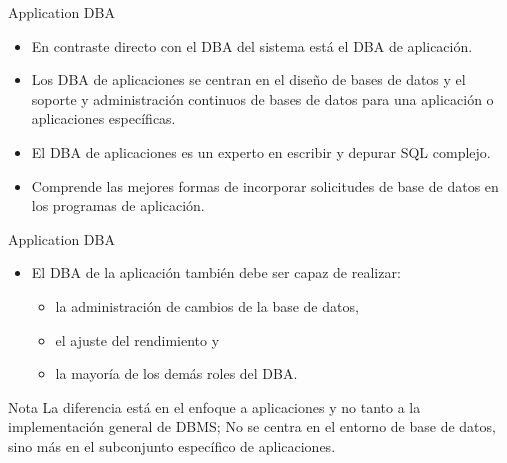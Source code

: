 \documentclass{beamer}
\begin{document}
\begin{frame}{Application DBA}
    \begin{itemize}
        \item En contraste directo con el DBA del sistema está el DBA de aplicación. 
        \item Los DBA de aplicaciones se centran en el diseño de bases de datos y el soporte y administración continuos de bases de datos para una aplicación o aplicaciones específicas.
        \item El DBA de aplicaciones es un experto en escribir y depurar SQL complejo.
        \item Comprende las mejores formas de incorporar solicitudes de base de datos en los programas de aplicación. 
    \end{itemize}
\end{frame}

\begin{frame}{Application DBA}
    \begin{itemize}
        \item El DBA de la aplicación también debe ser capaz de realizar:
        \begin{itemize}
            \item la administración de cambios de la base de datos, 
            \item el ajuste del rendimiento y 
            \item la mayoría de los demás roles del DBA. 
        \end{itemize}
    \end{itemize}
    \begin{alertblock}{Nota}
        La diferencia está en el enfoque a aplicaciones y no tanto a la implementación general de DBMS; No se centra en el entorno de base de datos, sino más en el subconjunto específico de aplicaciones.
    \end{alertblock}
\end{frame}
\end{document}
